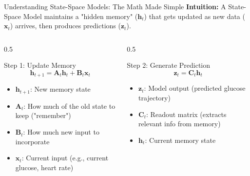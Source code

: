 \documentclass[aspectratio=169,xcolor=dvipsnames]{beamer}
\begin{document}
\begin{frame}{Understanding State-Space Models: The Math Made Simple}
    \textbf{Intuition:} A State-Space Model maintains a "hidden memory" ($\mathbf{h}_t$) that gets updated as new data ($\mathbf{x}_t$) arrives, then produces predictions ($\mathbf{z}_t$).
    
    \vspace{1em}
    \begin{columns}
        \begin{column}{0.5\textwidth}
            \begin{block}{Step 1: Update Memory}
                $$\mathbf{h}_{t+1} = \mathbf{A}_t \mathbf{h}_t + \mathbf{B}_t \mathbf{x}_t$$
                \begin{itemize}
                    \item $\mathbf{h}_{t+1}$: New memory state
                    \item $\mathbf{A}_t$: How much of the old state to keep ("remember")
                    \item $\mathbf{B}_t$: How much new input to incorporate
                    \item $\mathbf{x}_t$: Current input (e.g., current glucose, heart rate)
                \end{itemize}
            \end{block}
        \end{column}
        
        \begin{column}{0.5\textwidth}
            \begin{block}{Step 2: Generate Prediction}
                $$\mathbf{z}_t = \mathbf{C}_t \mathbf{h}_t$$
                \begin{itemize}
                    \item $\mathbf{z}_t$: Model output (predicted glucose trajectory)
                    \item $\mathbf{C}_t$: Readout matrix (extracts relevant info from memory)
                    \item $\mathbf{h}_t$: Current memory state
                \end{itemize}
            \end{block}
        \end{column}
    \end{columns}
\end{frame}
\end{document}
